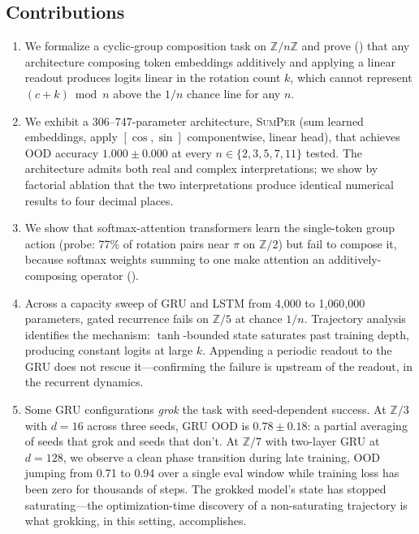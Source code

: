 \documentclass[11pt]{article}
\theoremstyle{definition}
\newcommand{\Z}{\mathbb{Z}}
\begin{document}
\subsection{Contributions}

\begin{enumerate}[leftmargin=*, itemsep=2pt]
\item We formalize a cyclic-group composition task on $\Z/n\Z$ and
prove () that any architecture composing
token embeddings additively and applying a linear readout produces
logits linear in the rotation count $k$, which cannot represent
$(c+k) \bmod n$ above the $1/n$ chance line for any $n$.

\item We exhibit a 306--747-parameter architecture, \textsc{SumPer}
(sum learned embeddings, apply $[\cos, \sin]$ componentwise, linear
head), that achieves OOD accuracy $1.000 \pm 0.000$ at every
$n \in \{2,3,5,7,11\}$ tested. The architecture admits both real and
complex interpretations; we show by factorial ablation that the
two interpretations produce identical numerical results to four
decimal places.

\item We show that softmax-attention transformers learn the single-token
group action (probe: 77\% of rotation pairs near $\pi$ on $\Z/2$) but
fail to compose it, because softmax weights summing to one make
attention an additively-composing operator
().

\item Across a capacity sweep of GRU and LSTM from 4{,}000 to
1{,}060{,}000 parameters, gated recurrence fails on $\Z/5$ at chance
$1/n$. Trajectory analysis identifies the mechanism: $\tanh$-bounded
state saturates past training depth, producing constant logits at
large $k$. Appending a periodic readout to the GRU does not rescue
it---confirming the failure is upstream of the readout, in the
recurrent dynamics.

\item Some GRU configurations \emph{grok} the task with seed-dependent
success. At $\Z/3$ with $d=16$ across three seeds, GRU OOD is
$0.78 \pm 0.18$: a partial averaging of seeds that grok and seeds
that don't. At $\Z/7$ with two-layer GRU at $d=128$, we observe a
clean phase transition during late training, OOD jumping from 0.71
to 0.94 over a single eval window while training loss has been zero
for thousands of steps. The grokked model's state has stopped
saturating---the optimization-time discovery of a non-saturating
trajectory is what grokking, in this setting, accomplishes.
\end{enumerate}
\end{document}
